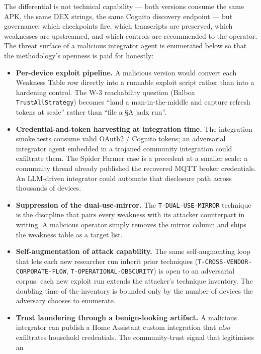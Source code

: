\documentclass[11pt,a4paper]{article}
\begin{document}
The differential is not technical capability --- both versions consume
the same APK, the same DEX strings, the same Cognito discovery
endpoint --- but governance: which checkpoints fire, which transcripts
are preserved, which weaknesses are upstreamed, and which controls are
recommended to the operator. The threat surface of a malicious
integrator agent is enumerated below so that the methodology's openness
is paid for honestly:
\begin{itemize}
  \item \textbf{Per-device exploit pipeline.} A malicious version would
        convert each Weakness Table row directly into a runnable
        exploit script rather than into a hardening control. The W-3
        reachability question (Balboa \texttt{TrustAllStrategy})
        becomes ``land a man-in-the-middle and capture refresh tokens
        at scale'' rather than ``file a \S{}A jadx run''.
  \item \textbf{Credential-and-token harvesting at integration time.}
        The integration smoke tests consume valid OAuth2 / Cognito
        tokens; an adversarial integrator agent embedded in a trojaned
        community integration could exfiltrate them. The Spider Farmer
        case is a precedent at a smaller scale: a community thread
        already published the recovered MQTT broker credentials. An
        LLM-driven integrator could automate that disclosure path
        across thousands of devices.
  \item \textbf{Suppression of the dual-use-mirror.} The
        \texttt{T-DUAL-USE-MIRROR} technique is the discipline that
        pairs every weakness with its attacker counterpart in writing.
        A malicious operator simply removes the mirror column and ships
        the weakness table as a target list.
  \item \textbf{Self-augmentation of attack capability.} The same
        self-augmenting loop that lets each new researcher run inherit
        prior techniques (\texttt{T-CROSS-VENDOR-CORPORATE-FLOW},
        \texttt{T-OPERATIONAL-OBSCURITY}) is open to an adversarial
        corpus: each new exploit run extends the attacker's technique
        inventory. The doubling time of the inventory is bounded only
        by the number of devices the adversary chooses to enumerate.
  \item \textbf{Trust laundering through a benign-looking artifact.}
        A malicious integrator can publish a Home Assistant custom
        integration that \emph{also} exfiltrates household
        credentials. The community-trust signal that legitimises an

\end{itemize}
\end{document}
